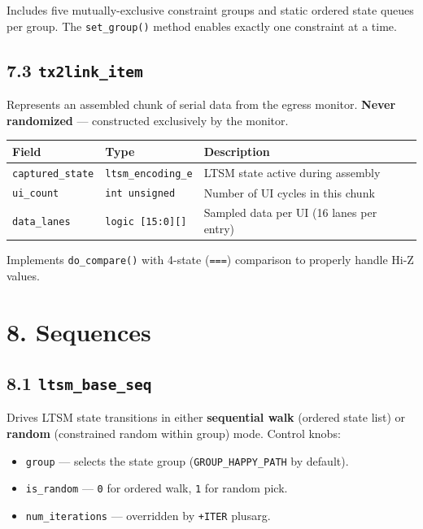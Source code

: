 \documentclass[11pt,a4paper]{article}
\begin{document}
Includes five mutually-exclusive constraint groups and static ordered state queues per group. The \texttt{set\_group()} method enables exactly one constraint at a time.

\subsection{7.3 \texttt{tx2link\_item}}

Represents an assembled chunk of serial data from the egress monitor. \textbf{Never randomized} --- constructed exclusively by the monitor.


\begin{tabularx}{\textwidth}{|X|X|X|}
\hline
\textbf{Field} & \textbf{Type} & \textbf{Description} \\
\hline
\texttt{captured\_state} & \texttt{ltsm\_encoding\_e} & LTSM state active during assembly \\
\hline
\texttt{ui\_count} & \texttt{int unsigned} & Number of UI cycles in this chunk \\
\hline
\texttt{data\_lanes} & \texttt{logic [15:0][]} & Sampled data per UI (16 lanes per entry) \\
\hline
\end{tabularx}


Implements \texttt{do\_compare()} with 4-state (\texttt{===}) comparison to properly handle Hi-Z values.


\section{8. Sequences}

\subsection{8.1 \texttt{ltsm\_base\_seq}}

Drives LTSM state transitions in either \textbf{sequential walk} (ordered state list) or \textbf{random} (constrained random within group) mode. Control knobs:

\begin{itemize}
  \item \texttt{group} --- selects the state group (\texttt{GROUP\_HAPPY\_PATH} by default).
  \item \texttt{is\_random} --- \texttt{0} for ordered walk, \texttt{1} for random pick.
  \item \texttt{num\_iterations} --- overridden by \texttt{+ITER} plusarg.
\end{itemize}
\end{document}
